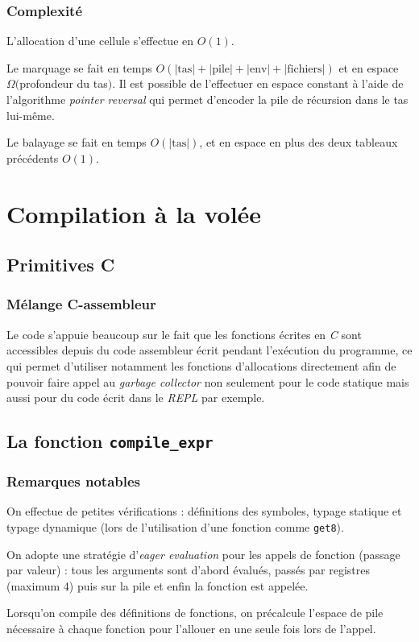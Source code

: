 \documentclass[c, 11pt, handout, xcolor=table]{beamer}
\newcommand{\codeLisp}[1]{\texttt{#1}}
\newcommand{\code}[1]{\texttt{#1}}
\newcommand{\foreign}[1]{\emph{#1}}
\begin{document}
\begin{frame}
 \frametitle{Complexité}
 
 L'allocation d'une cellule s'effectue en $O(1)$.
 
 Le marquage se fait en temps $O(|\mathrm{tas}| + |\mathrm{pile}| + |\mathrm{env}| + |\mathrm{fichiers}|)$ et en espace $\Omega($profondeur du tas$)$. Il est possible de l'effectuer en espace constant à l'aide de l'algorithme \foreign{pointer reversal} qui permet d'encoder la pile de récursion dans le tas lui-même.
 
 Le balayage se fait en temps $O(|\mathrm{tas}|)$, et en espace en plus des deux tableaux précédents $O(1)$.
 
\end{frame}



\section{Compilation à la volée}

\subsection{Primitives C}

\begin{frame}
 \frametitle{Mélange C-assembleur}
 
 Le code s'appuie beaucoup sur le fait que les fonctions écrites en \foreign{C} sont accessibles depuis du code assembleur écrit pendant l'exécution du programme, ce qui permet d'utiliser notamment les fonctions d'allocations directement afin de pouvoir faire appel au \foreign{garbage collector} non seulement pour le code statique mais aussi pour du code écrit dans le \foreign{REPL} par exemple.
\end{frame}

\subsection{La fonction \code{compile\_expr}}

\begin{frame}
 \frametitle{Remarques notables}
 
 On effectue de petites vérifications : définitions des symboles, typage statique et typage dynamique (lors de l'utilisation d'une fonction comme \codeLisp{get8}).
 
 On adopte une stratégie d'\foreign{eager evaluation} pour les appels de fonction (passage par valeur) : tous les arguments sont d'abord évalués, passés par registres (maximum 4) puis sur la pile et enfin la fonction est appelée.
 
 Lorsqu'on compile des définitions de fonctions, on précalcule l'espace de pile nécessaire à chaque fonction pour l'allouer en une seule fois lors de l'appel.
\end{frame}
\end{document}
